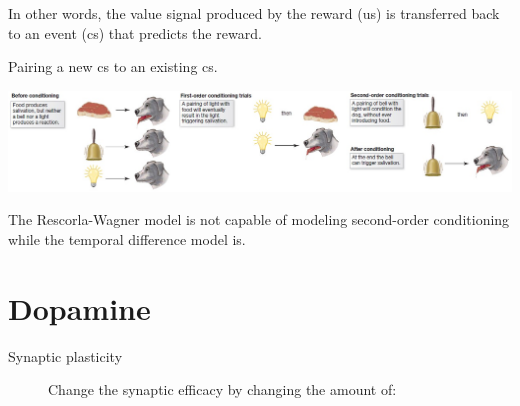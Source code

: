 In other words, the value signal produced by the reward (\ac{us}) is transferred back to an event (\ac{cs}) that predicts the reward.

\begin{example}
    Pairing a new \ac{cs} to an existing \ac{cs}.

    \begin{center}
        \includegraphics[width=0.9\linewidth]{./img/second_order_conditioning.png}
    \end{center}

    \begin{remark}
        The Rescorla-Wagner model is not capable of modeling second-order conditioning while 
        the temporal difference model is.
    \end{remark}
\end{example}



\section{Dopamine}

\begin{description}
    \item[Synaptic plasticity]
        Change the synaptic efficacy by changing the amount of:
\end{description}


